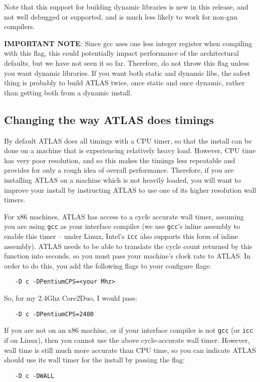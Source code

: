 \documentclass[11pt]{article}
\begin{document}
Note that this support for building dynamic libraries is new in this release,
and not well debugged or supported, and is much less likely to work for
non-gnu compilers.

\textbf{IMPORTANT NOTE}: Since gcc uses one less integer register when
      compiling with this flag, this
      could potentially impact performance of the architectural defaults,
      but we have not seen it so far.  Therefore, do not throw this flag
      unless you want dynamic libraries.  If you want both static and dynamic
      libs, the safest thing is probably to build ATLAS twice, once static
      and once dynamic, rather than getting both from a dynamic install.


\subsection{Changing the way ATLAS does timings}
\label{sec-time-flags}

By default ATLAS does all timings with a CPU timer, so that the install
can be done on a machine that is experiencing relatively heavy load.  However,
CPU time has very poor resolution, and so this makes the timings less repeatable
and provides for only a rough idea of overall performance.  Therefore, if
you are installing ATLAS on a machine which is not heavily loaded, you will
want to improve your install by instructing ATLAS to use one of its higher
resolution wall timers.

For x86 machines, ATLAS has access to a cycle accurate wall timer, assuming
you are using {\tt gcc} as your interface compiler (we use {\tt gcc}'s inline
assembly to enable this timer -- under Linux, Intel's {\tt icc} also supports
this form of inline
assembly).  ATLAS needs to be able to translate the cycle count returned by
this function into seconds, so you must pass your machine's clock rate to
ATLAS.  In order to do this, you add the following flags to your 
configure flags:
\vspace*{-0.1in}
\begin{verbatim}
   -D c -DPentiumCPS=<your Mhz>
\end{verbatim}
So, for my 2.4Ghz Core2Duo, I would pass:
\vspace*{-0.1in}
\begin{verbatim}
   -D c -DPentiumCPS=2400
\end{verbatim}

If you are not on an x86 machine, or if your interface compiler is not {\tt gcc}
(or {\tt icc} if on Linux), then you cannot use the above cycle-accurate
wall timer.  However, wall time is still much more accurate than CPU time,
so you can indicate ATLAS should use its wall timer for the install by passing
the flag:
\vspace*{-0.1in}
\begin{verbatim}
   -D c -DWALL
\end{verbatim}
\end{document}
